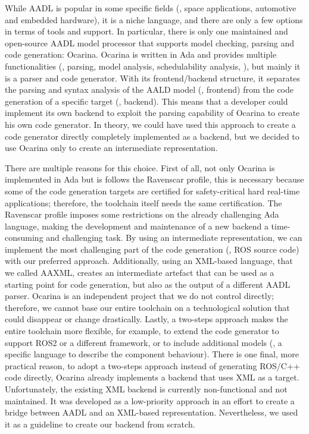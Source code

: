 While AADL is popular in some specific fields (\eg, space applications, automotive and embedded hardware), it is a niche language, and there are only a few options in terms of tools and support. In particular, there is only one maintained and open-source AADL model processor that supports model checking, parsing and code generation: Ocarina. Ocarina is written in Ada and provides multiple functionalities (\eg, parsing, model analysis, schedulability analysis, \etc), but mainly it is a parser and code generator. With its frontend/backend structure, it separates the parsing and syntax analysis of the AALD model (\ie, frontend) from the code generation of a specific target (\ie, backend). This means that a developer could implement its own backend to exploit the parsing capability of Ocarina to create his own code generator. In theory, we could have used this approach to create a code generator directly completely implemented as a backend, but we decided to use Ocarina only to create an intermediate representation.

There are multiple reasons for this choice. First of all, not only Ocarina is implemented in Ada but is follows the Ravenscar profile, this is necessary because some of the code generation targets are certified for safety-critical hard real-time applications; therefore, the toolchain itself needs the same certification. The Ravenscar profile imposes some restrictions on the already challenging Ada language, making the development and maintenance of a new backend a time-consuming and challenging task. By using an intermediate representation, we can implement the most challenging part of the code generation (\ie, ROS source code) with our preferred approach. Additionally, using an XML-based language, that we called AAXML, creates an intermediate artefact that can be used as a starting point for code generation, but also as the output of a different AADL parser. Ocarina is an independent project that we do not control directly; therefore, we cannot base our entire toolchain on a technological solution that could disappear or change drastically. Lastly, a two-steps approach makes the entire toolchain more flexible, for example, to extend the code generator to support ROS2 or a different framework, or to include additional models (\eg, a specific language to describe the component behaviour). There is one final, more practical reason, to adopt a two-steps approach instead of generating ROS/C++ code directly, Ocarina already implements a backend that uses XML as a target. Unfortunately, the existing XML backend is currently non-functional and not maintained. It was developed as a low-priority approach in an effort to create a bridge between AADL and an XML-based representation. Nevertheless, we used it as a guideline to create our backend from scratch.

